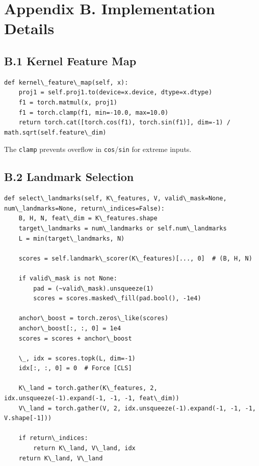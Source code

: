 \section{Appendix B. Implementation Details}

\subsection{B.1 Kernel Feature Map}

\begin{lstlisting}
def kernel\_feature\_map(self, x):
    proj1 = self.proj1.to(device=x.device, dtype=x.dtype)
    f1 = torch.matmul(x, proj1)
    f1 = torch.clamp(f1, min=-10.0, max=10.0)
    return torch.cat([torch.cos(f1), torch.sin(f1)], dim=-1) / math.sqrt(self.feature\_dim)
\end{lstlisting}

The \texttt{clamp} prevents overflow in \texttt{cos}/\texttt{sin} for extreme inputs.

\subsection{B.2 Landmark Selection}

\begin{lstlisting}
def select\_landmarks(self, K\_features, V, valid\_mask=None, num\_landmarks=None, return\_indices=False):
    B, H, N, feat\_dim = K\_features.shape
    target\_landmarks = num\_landmarks or self.num\_landmarks
    L = min(target\_landmarks, N)
    
    scores = self.landmark\_scorer(K\_features)[..., 0]  # (B, H, N)
    
    if valid\_mask is not None:
        pad = (~valid\_mask).unsqueeze(1)
        scores = scores.masked\_fill(pad.bool(), -1e4)
    
    anchor\_boost = torch.zeros\_like(scores)
    anchor\_boost[:, :, 0] = 1e4
    scores = scores + anchor\_boost
    
    \_, idx = scores.topk(L, dim=-1)
    idx[:, :, 0] = 0  # Force [CLS]
    
    K\_land = torch.gather(K\_features, 2, idx.unsqueeze(-1).expand(-1, -1, -1, feat\_dim))
    V\_land = torch.gather(V, 2, idx.unsqueeze(-1).expand(-1, -1, -1, V.shape[-1]))
    
    if return\_indices:
        return K\_land, V\_land, idx
    return K\_land, V\_land
\end{lstlisting}

